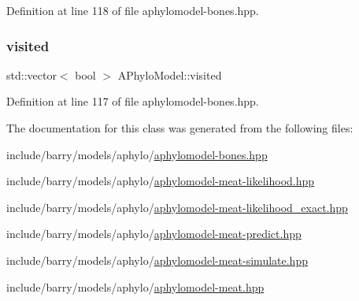 Definition at line 118 of file aphylomodel-\/bones.\+hpp.

\mbox{\label{class_a_phylo_model_ac98b6767ff0c32b30caf23dbf6810578}} 
\subsubsection{\texorpdfstring{visited}{visited}}
{\footnotesize\ttfamily std\+::vector$<$ bool $>$ A\+Phylo\+Model\+::visited}



Definition at line 117 of file aphylomodel-\/bones.\+hpp.



The documentation for this class was generated from the following files\+:\begin{DoxyCompactItemize}
\item 
include/barry/models/aphylo/\hyperlink{aphylomodel-bones_8hpp}{aphylomodel-\/bones.\+hpp}\item 
include/barry/models/aphylo/\hyperlink{aphylomodel-meat-likelihood_8hpp}{aphylomodel-\/meat-\/likelihood.\+hpp}\item 
include/barry/models/aphylo/\hyperlink{aphylomodel-meat-likelihood__exact_8hpp}{aphylomodel-\/meat-\/likelihood\+\_\+exact.\+hpp}\item 
include/barry/models/aphylo/\hyperlink{aphylomodel-meat-predict_8hpp}{aphylomodel-\/meat-\/predict.\+hpp}\item 
include/barry/models/aphylo/\hyperlink{aphylomodel-meat-simulate_8hpp}{aphylomodel-\/meat-\/simulate.\+hpp}\item 
include/barry/models/aphylo/\hyperlink{aphylomodel-meat_8hpp}{aphylomodel-\/meat.\+hpp}\end{DoxyCompactItemize}
